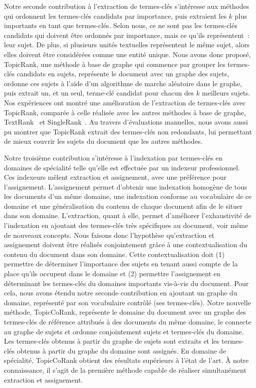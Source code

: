     Notre seconde contribution à l'extraction de termes-clés s'intéresse aux
    méthodes qui ordonnent les termes-clés candidats par importance, puis
    extraient les $k$ plus importants en tant que termes-clés. Selon nous, ce ne
    sont pas les termes-clés candidats qui doivent être ordonnés par importance,
    mais ce qu'ils représentent~: leur sujet. De plus, si plusieurs unités
    textuelles représentent le même sujet, alors elles doivent être considérées
    comme une entité unique. Nous avons donc proposé, TopicRank, une méthode à
    base de graphe qui commence par grouper les termes-clés candidats en sujets,
    représente le document avec un graphe des sujets, ordonne ces sujets à
    l'aide d'un algorithme de marche aléatoire dans le graphe, puis extrait un,
    et un seul, terme-clé candidat pour chacun des $k$ meilleurs sujets. Nos
    expériences ont montré une amélioration de l'extraction de termes-clés
    avec TopicRank, comparée à celle réalisée avec les autres méthodes à base de
    graphe, TextRank~\cite{mihalcea2004textrank} et
    SingleRank~\cite{wan2008expandrank}. Au
    travers d'évaluations manuelles, nous avons aussi pu montrer que TopicRank
    extrait des termes-clés non redondants, lui permettant de mieux couvrir les
    sujets du document que les autres méthodes.

    Notre troisième contribution s'intéresse à l'indexation par termes-clés en
    domaines de spécialité telle qu'elle est effectuée par un indexeur
    professionnel. Ces indexeurs mêlent extraction et assignement, avec une
    préférence pour l'assignement. L'assignement permet d'obtenir une indexation
    homogène de tous les documents d'un même domaine, une indexation conforme au
    vocabulaire de ce domaine et une généralisation du contenu de chaque
    document afin de le situer dans son domaine. L'extraction, quant à elle,
    permet d'améliorer l'exhaustivité de l'indexation en ajoutant des
    termes-clés très spécifiques au document, voir même de nouveaux concepts.
    Nous faisons donc l'hypothèse qu'extraction et assignement doivent être
    réalisés conjointement grâce à une contextualisation du contenu du
    document dans son domaine. Cette contextualisation doit (1) permettre de
    déterminer l'importance des sujets en tenant aussi compte de la place qu'ils
    occupent dans le domaine et (2) permettre l'assignement en déterminant les
    termes-clés du domaines importants vis-à-vis du document.
    Pour cela, nous avons étendu notre seconde contribution en ajoutant un
    graphe du domaine, représenté par son vocabulaire contrôlé (ses
    termes-clés). Notre nouvelle méthode, TopicCoRank, représente le domaine du
    document avec un graphe des termes-clés de référence attribués à des
    documents du même domaine, le connecte au graphe de sujets et ordonne
    conjointement sujets et termes-clés du domaine. Les termes-clés obtenus à
    partir du graphe de sujets sont extraits et les termes-clés obtenus à partir
    du graphe du domaine sont assignés. En domaine de spécialité, TopicCoRank
    obtient des résultats supérieurs à l'état de l'art. À notre connaissance, il
    s'agit de la première méthode capable de réaliser simultanément
    extraction et assignement.

